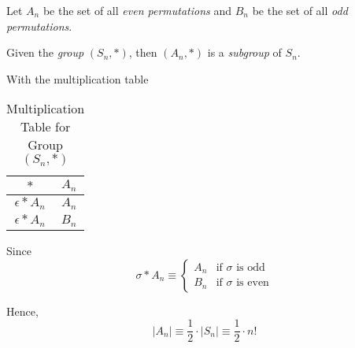 \begin{remark}
    Let $A_n$ be the set of all \textit{even permutations} and $B_n$ be the set of all \textit{odd permutations}.
    
    Given the \textit{group} $(S_n, \ast)$, then $(A_n, \ast)$ is a \textit{subgroup} of $S_n$.
    
    With the multiplication table
    \begin{table}[H]
    \centering
    \begin{tabular}{c | c}
    \toprule
    $\ast$              & $A_n$ \\ 
    \midrule
    $\epsilon \ast A_n$ & $A_n$ \\
    $\epsilon \ast A_n$ & $B_n$ \\ 
    \bottomrule
    \end{tabular}
    \caption{Multiplication Table for Group $(S_n, \ast)$}
    \end{table}
    
    Since
    \begin{equation}
        \sigma \ast A_n \equiv \begin{cases}
            A_n &\text{if $\sigma$ is odd} \\
            B_n &\text{if $\sigma$ is even}
        \end{cases}
    \end{equation}
    
    Hence,
    \begin{equation}
        \lvert A_n \rvert \equiv \frac{1}{2} \cdot \lvert S_n \rvert \equiv \frac{1}{2} \cdot n!
    \end{equation}
\end{remark}
